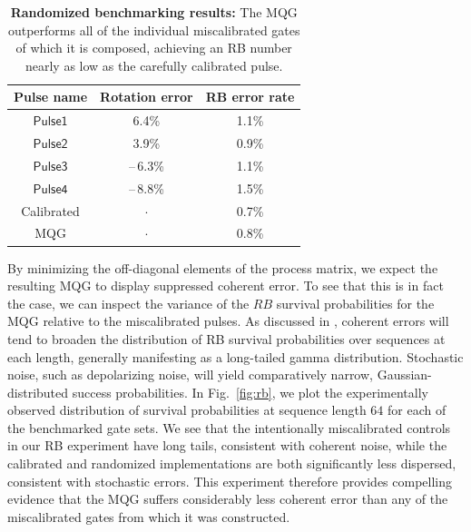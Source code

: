 \documentclass[aps,nofootinbib,pra,notitlepage,twocolumn]{revtex4-1}
\newcommand{\0}{\ensuremath{\mathbf{0}}}
\begin{document}
\setlength{\tabcolsep}{0.5em} 
{\renewcommand{\arraystretch}{1.2}
\begin{table}[h]
	\centering
	\begin{tabular}{@{}ccc@{}}
		\hline
		Pulse name & Rotation error & RB error rate\\
		\hline
		$\mathsf{Pulse1}$ 	& 6.4\% 	& 1.1\% \\
		$\mathsf{Pulse2}$ 	& 3.9\% 	& 0.9\% \\
		$\mathsf{Pulse3}$ 	& --\,6.3\% 	& 1.1\% \\
		$\mathsf{Pulse4}$ 	& --\,8.8\% 	& 1.5\% \\
		Calibrated 			& $\cdot$  	& 0.7\% \\
		MQG 				& $\cdot$ 	& 0.8\% \\
		\hline
	\end{tabular}
	\caption{\textbf{Randomized benchmarking results:} The MQG outperforms all of the individual miscalibrated gates of which it is composed, achieving an RB number nearly as low as the carefully calibrated pulse. }
\label{tabl:rb}
\end{table}

By minimizing the off-diagonal elements of the process matrix, we expect the resulting MQG to display suppressed coherent error. To see that this is in fact the case, we can inspect the variance of the $RB$ survival probabilities for the MQG relative to the miscalibrated pulses. As discussed in \cite{Ball2016}, coherent errors will tend to broaden the distribution of RB survival probabilities over sequences at each length, generally manifesting as a long-tailed gamma distribution. Stochastic noise, such as depolarizing noise, will yield comparatively narrow, Gaussian-distributed success probabilities. In Fig.~\ref{fig:rb}, we plot the experimentally observed distribution of survival probabilities at sequence length $64$ for each of the benchmarked gate sets. We see that the intentionally miscalibrated controls in our RB experiment have long tails, consistent with coherent noise, while the calibrated and randomized implementations are both significantly less dispersed, consistent with stochastic errors. This experiment therefore provides compelling evidence that the MQG suffers considerably less coherent error than any of the miscalibrated gates from which it was constructed.


}
\end{document}
